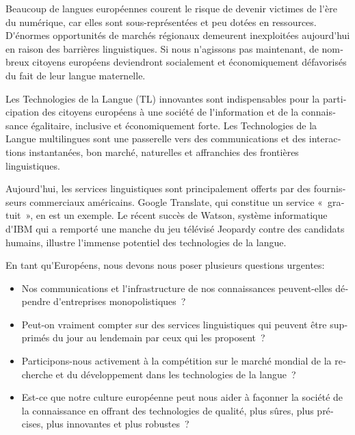 \begin{french}


\begin{multicols}{2}

Beaucoup de langues européennes courent le risque de devenir victimes
de l{\mbox '}ère du numérique, car elles sont sous-représentées et peu
dotées en ressources. D{\mbox '}énormes opportunités de marchés
régionaux demeurent inexploitées aujourd{\mbox '}hui en raison des
barrières linguistiques. Si nous n{\mbox '}agissons pas maintenant, de
nombreux citoyens européens deviendront socialement et économiquement
défavorisés du fait de leur langue maternelle.

Les Technologies de la Langue (TL) innovantes sont indispensables pour
la participation des citoyens européens à une société de l{\mbox
  '}information et de la connaissance égalitaire, inclusive et
économiquement forte. Les Technologies de la Langue multilingues sont
une passerelle vers des communications et des interactions
instantanées, bon marché, naturelles et affranchies des frontières
linguistiques.

Aujourd{\mbox '}hui, les services linguistiques sont principalement offerts
par des fournisseurs commerciaux américains. Google Translate, qui
constitue un service «~gratuit~», en est un exemple. Le récent succès de
Watson, système informatique d{\mbox '}IBM qui a remporté une manche du
jeu télévisé Jeopardy contre des candidats humains, illustre
l{\mbox '}immense potentiel des technologies de la langue.

En tant qu{\mbox '}Européens, nous devons nous poser plusieurs
questions urgentes:

\begin{itemize}

\item Nos communications et l{\mbox '}infrastructure de nos connaissances
  peuvent-elles dépendre d{\mbox '}entreprises monopolistiques~?

\item Peut-on vraiment compter sur des services linguistiques qui
  peuvent être supprimés du jour au lendemain par ceux qui les
  proposent~?

\item Participons-nous activement à la compétition sur le marché
  mondial de la recherche et du développement dans les technologies de
  la langue~?

\item Est-ce que notre culture européenne peut nous aider à façonner
  la société de la connaissance en offrant des technologies de qualité,
  plus sûres, plus précises, plus innovantes et plus robustes~?


\end{itemize}
\end{multicols}
\end{french}
